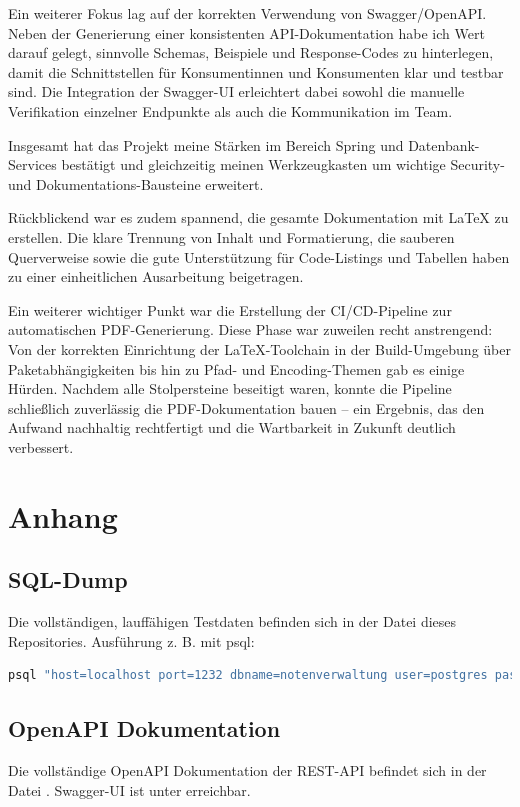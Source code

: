 \documentclass[12pt,a4paper]{article}
\newcommand{\code}[1]{\texttt{\detokenize{#1}}}
\begin{document}
    Ein weiterer Fokus lag auf der korrekten Verwendung von Swagger/OpenAPI. Neben der Generierung
    einer konsistenten API-Dokumentation habe ich Wert darauf gelegt, sinnvolle Schemas, Beispiele
    und Response-Codes zu hinterlegen, damit die Schnittstellen für Konsumentinnen und Konsumenten
    klar und testbar sind. Die Integration der Swagger-UI erleichtert dabei sowohl die manuelle
    Verifikation einzelner Endpunkte als auch die Kommunikation im Team.

    Insgesamt hat das Projekt meine Stärken im Bereich Spring und Datenbank-Services bestätigt und
    gleichzeitig meinen Werkzeugkasten um wichtige Security- und Dokumentations-Bausteine erweitert.

    Rückblickend war es zudem spannend, die gesamte Dokumentation mit \LaTeX{} zu erstellen. Die klare
    Trennung von Inhalt und Formatierung, die sauberen Querverweise sowie die gute Unterstützung für
    Code-Listings und Tabellen haben zu einer einheitlichen Ausarbeitung beigetragen.

    Ein weiterer wichtiger Punkt war die Erstellung der CI/CD-Pipeline zur automatischen PDF-Generierung.
    Diese Phase war zuweilen recht anstrengend: Von der korrekten Einrichtung der \LaTeX{}-Toolchain in
    der Build-Umgebung über Paketabhängigkeiten bis hin zu Pfad- und Encoding-Themen gab es einige
    Hürden. Nachdem alle Stolpersteine beseitigt waren, konnte die Pipeline schließlich zuverlässig die
    PDF-Dokumentation bauen – ein Ergebnis, das den Aufwand nachhaltig rechtfertigt und die Wartbarkeit
    in Zukunft deutlich verbessert.

    \newpage

    \section{Anhang}

    \subsection{SQL-Dump}
    Die vollständigen, lauffähigen Testdaten befinden sich in der Datei \code{data\\testdata.sql} dieses Repositories.\newline
    Ausführung z. B. mit psql:
    \begin{lstlisting}[language=bash]
psql "host=localhost port=1232 dbname=notenverwaltung user=postgres password=postgres" -f data/testdata.sql
    \end{lstlisting}

    \subsection{OpenAPI Dokumentation}
    Die vollständige OpenAPI Dokumentation der REST-API befindet sich in der Datei \code{doc.json}.
    Swagger-UI ist unter \code{/api/public/docs} erreichbar.
\end{document}
